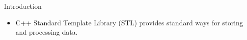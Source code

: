 \begin{frame}{Introduction}
    \begin{itemize}
        \item C++ Standard Template Library (STL) provides standard ways for storing and processing data.
    \end{itemize}
\end{frame}
